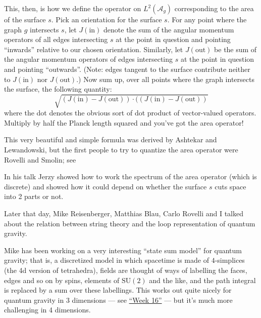 \documentclass{article}
\renewcommand{\texttt}[1]{%
  \begingroup
  \ttfamily
  \begingroup\lccode`~=`/\lowercase{\endgroup\def~}{/\discretionary{}{}{}}%
  \begingroup\lccode`~=`[\lowercase{\endgroup\def~}{[\discretionary{}{}{}}%
  \begingroup\lccode`~=`.\lowercase{\endgroup\def~}{.\discretionary{}{}{}}%
  \catcode`/=\active\catcode`[=\active\catcode`.=\active
  \scantokens{#1\noexpand}%
  \endgroup
}
\begin{document}
\begin{itemize}
  This, then, is how we define the operator on \(L^2(\mathcal{A}_g)\)
  corresponding to the area of the surface \(s\). Pick an orientation
  for the surface \(s\). For any point where the graph \(g\) intersects
  \(s\), let \(J(\mathrm{in})\) denote the sum of the angular momentum
  operators of all edges intersecting \(s\) at the point in question and
  pointing ``inwards'' relative to our chosen orientation. Similarly,
  let \(J(\mathrm{out})\) be the sum of the angular momentum operators
  of edges intersecting \(s\) at the point in question and pointing
  ``outwards''. (Note: edges tangent to the surface contribute neither
  to \(J(\mathrm{in})\) nor \(J(\mathrm{out})\).) Now sum up, over all
  points where the graph intersects the surface, the following quantity:
  \[\sqrt{(J(\mathrm{in})-J(\mathrm{out})) \cdot ((J(\mathrm{in})-J(\mathrm{out}))}\]
  where the dot denotes the obvious sort of dot product of vector-valued
  operators. Multiply by half the Planck length squared and you've got
  the area operator!

  This very beautiful and simple formula was derived by Ashtekar and
  Lewandowski, but the first people to try to quantize the area operator
  were Rovelli and Smolin; see


  In his talk Jerzy showed how to work the spectrum of the area operator
  (which is discrete) and showed how it could depend on whether the
  surface \(s\) cuts space into 2 parts or not.

  Later that day, Mike Reisenberger, Matthias Blau, Carlo Rovelli and I
  talked about the relation between string theory and the loop
  representation of quantum gravity.

  Mike has been working on a very interesting ``state sum model'' for
  quantum gravity; that is, a discretized model in which spacetime is
  made of \(4\)-simplices (the 4d version of tetrahedra), fields are
  thought of ways of labelling the faces, edges and so on by spins,
  elements of \(\mathrm{SU}(2)\) and the like, and the path integral is
  replaced by a sum over these labellings. This works out quite nicely
  for quantum gravity in 3 dimensions --- see
  \protect\hyperlink{week16}{``Week 16''} --- but it's much more
  challenging in 4 dimensions.


\end{itemize}
\end{document}
